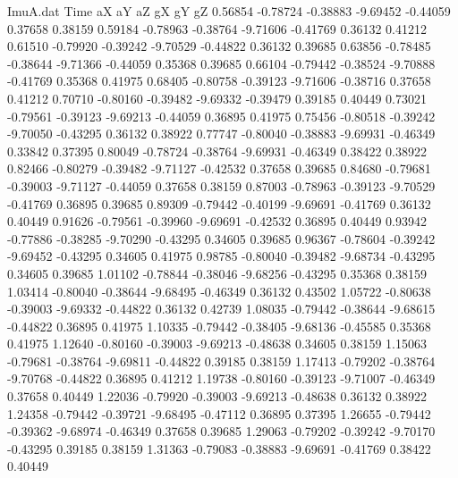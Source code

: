 \begin{filecontents}{ImuA.dat}
Time aX aY aZ gX gY gZ
   0.56854   -0.78724   -0.38883   -9.69452   -0.44059    0.37658    0.38159
   0.59184   -0.78963   -0.38764   -9.71606   -0.41769    0.36132    0.41212
   0.61510   -0.79920   -0.39242   -9.70529   -0.44822    0.36132    0.39685
   0.63856   -0.78485   -0.38644   -9.71366   -0.44059    0.35368    0.39685
   0.66104   -0.79442   -0.38524   -9.70888   -0.41769    0.35368    0.41975
   0.68405   -0.80758   -0.39123   -9.71606   -0.38716    0.37658    0.41212
   0.70710   -0.80160   -0.39482   -9.69332   -0.39479    0.39185    0.40449
   0.73021   -0.79561   -0.39123   -9.69213   -0.44059    0.36895    0.41975
   0.75456   -0.80518   -0.39242   -9.70050   -0.43295    0.36132    0.38922
   0.77747   -0.80040   -0.38883   -9.69931   -0.46349    0.33842    0.37395
   0.80049   -0.78724   -0.38764   -9.69931   -0.46349    0.38422    0.38922
   0.82466   -0.80279   -0.39482   -9.71127   -0.42532    0.37658    0.39685
   0.84680   -0.79681   -0.39003   -9.71127   -0.44059    0.37658    0.38159
   0.87003   -0.78963   -0.39123   -9.70529   -0.41769    0.36895    0.39685
   0.89309   -0.79442   -0.40199   -9.69691   -0.41769    0.36132    0.40449
   0.91626   -0.79561   -0.39960   -9.69691   -0.42532    0.36895    0.40449
   0.93942   -0.77886   -0.38285   -9.70290   -0.43295    0.34605    0.39685
   0.96367   -0.78604   -0.39242   -9.69452   -0.43295    0.34605    0.41975
   0.98785   -0.80040   -0.39482   -9.68734   -0.43295    0.34605    0.39685
   1.01102   -0.78844   -0.38046   -9.68256   -0.43295    0.35368    0.38159
   1.03414   -0.80040   -0.38644   -9.68495   -0.46349    0.36132    0.43502
   1.05722   -0.80638   -0.39003   -9.69332   -0.44822    0.36132    0.42739
   1.08035   -0.79442   -0.38644   -9.68615   -0.44822    0.36895    0.41975
   1.10335   -0.79442   -0.38405   -9.68136   -0.45585    0.35368    0.41975
   1.12640   -0.80160   -0.39003   -9.69213   -0.48638    0.34605    0.38159
   1.15063   -0.79681   -0.38764   -9.69811   -0.44822    0.39185    0.38159
   1.17413   -0.79202   -0.38764   -9.70768   -0.44822    0.36895    0.41212
   1.19738   -0.80160   -0.39123   -9.71007   -0.46349    0.37658    0.40449
   1.22036   -0.79920   -0.39003   -9.69213   -0.48638    0.36132    0.38922
   1.24358   -0.79442   -0.39721   -9.68495   -0.47112    0.36895    0.37395
   1.26655   -0.79442   -0.39362   -9.68974   -0.46349    0.37658    0.39685
   1.29063   -0.79202   -0.39242   -9.70170   -0.43295    0.39185    0.38159
   1.31363   -0.79083   -0.38883   -9.69691   -0.41769    0.38422    0.40449

\end{filecontents}
